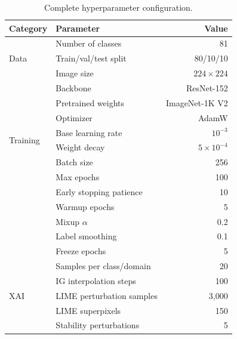 \documentclass[12pt, a4paper]{article}
\begin{document}
\begin{table}[H]
\centering
\caption{Complete hyperparameter configuration.}
\label{tab:hyperparams}
\begin{tabular}{llr}
\toprule
\textbf{Category} & \textbf{Parameter} & \textbf{Value} \\
\midrule
\multirow{3}{*}{Data}
    & Number of classes       & 81 \\
    & Train/val/test split    & 80/10/10 \\
    & Image size              & $224 \times 224$ \\
\midrule
\multirow{8}{*}{Training}
    & Backbone                & ResNet-152 \\
    & Pretrained weights      & ImageNet-1K V2 \\
    & Optimizer               & AdamW \\
    & Base learning rate      & $10^{-3}$ \\
    & Weight decay            & $5 \times 10^{-4}$ \\
    & Batch size              & 256 \\
    & Max epochs              & 100 \\
    & Early stopping patience & 10 \\
    & Warmup epochs           & 5 \\
    & Mixup $\alpha$          & 0.2 \\
    & Label smoothing         & 0.1 \\
    & Freeze epochs           & 5 \\
\midrule
\multirow{5}{*}{XAI}
    & Samples per class/domain & 20 \\
    & IG interpolation steps   & 100 \\
    & LIME perturbation samples & 3{,}000 \\
    & LIME superpixels          & 150 \\
    & Stability perturbations   & 5 \\
\bottomrule
\end{tabular}
\end{table}
\end{document}
